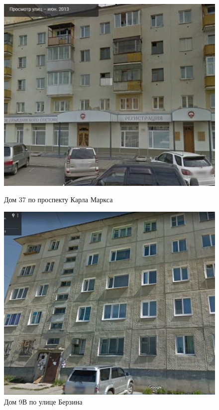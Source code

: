 \begin{figure}[H]
\begin{changemargin}{2cm}{2cm}
  \begin{center}
    \begin{minipage}[h]{0.45\linewidth}
        \includegraphics[width=1\textwidth]{authors/sydchak-fig-3.jpg}
        \caption{Дом 37 по проспекту Карла Маркса}
        \label{fig:sydchak-fig-3}
    \end{minipage}
\hfill
    \begin{minipage}[h]{0.45\linewidth}
        \includegraphics[width=1\textwidth]{authors/sydchak-fig-4.jpg}
        \caption{Дом 9В по улице Берзина}
        \label{fig:sydchak-fig-4}
    \end{minipage}


  \end{center}
\end{changemargin}

\end{figure}
